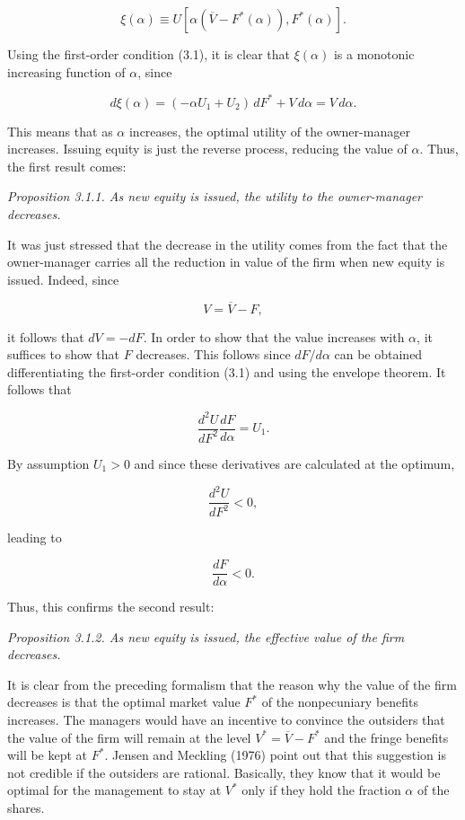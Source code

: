 \documentclass[11pt,a4paper]{article}
\begin{document}
\[\xi(\alpha) \equiv U[\alpha(\overline{V} - F^*(\alpha)), F^*(\alpha)].\]

Using the first-order condition (3.1), it is clear that \(\xi(\alpha)\) is a monotonic increasing
function of \(\alpha\), since

\[d\xi(\alpha) = (-\alpha U_1 + U_2)\,dF^* + V\,d\alpha = V\,d\alpha.\]

This means that as \(\alpha\) increases, the optimal utility of the owner-manager increases. Issuing
equity is just the reverse process, reducing the value of \(\alpha\). Thus, the first result comes:

\emph{Proposition 3.1.1. As new equity is issued, the utility to the owner-manager decreases.}

It was just stressed that the decrease in the utility comes from the fact that the owner-manager
carries all the reduction in value of the firm when new equity is issued. Indeed, since

\[V = \overline{V} - F,\]

it follows that \(dV = -dF\). In order to show that the value increases with \(\alpha\), it suffices
to show that \(F\) decreases. This follows since \(dF/d\alpha\) can be obtained differentiating the
first-order condition (3.1) and using the envelope theorem. It follows that

\[\frac{d^2U}{dF^2}\frac{dF}{d\alpha} = U_1.\]

By assumption \(U_1 > 0\) and since these derivatives are calculated at the optimum,

\[\frac{d^2U}{dF^2} < 0,\]

leading to

\[\frac{dF}{d\alpha} < 0.\]

Thus, this confirms the second result:

\emph{Proposition 3.1.2. As new equity is issued, the effective value of the firm decreases.}

It is clear from the preceding formalism that the reason why the value of the firm decreases is that
the optimal market value \(F^*\) of the nonpecuniary benefits increases. The managers would have an
incentive to convince the outsiders that the value of the firm will remain at the level
\(V^* = \overline{V} - F^*\) and the fringe benefits will be kept at \(F^*\). Jensen and Meckling
(1976) point out that this suggestion is not credible if the outsiders are rational. Basically, they
know that it would be optimal for the management to stay at \(V^*\) only if they hold the fraction
\(\alpha\) of the shares.
\end{document}
